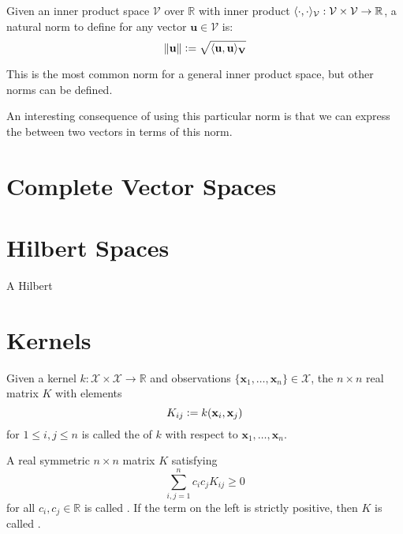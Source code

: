 
Given an inner product space $\mathcal{V}$ over $\mathbb{R}$ with inner product $\langle\cdot, \cdot\rangle_\mathcal{V} : \mathcal{V} \times \mathcal{V} \to \mathbb{R}$, a natural norm to define for any vector $\mathbf{u} \in \mathcal{V}$ is:
\begin{equation}
	\lVert\mathbf{u}\rVert \vcentcolon= \sqrt{\langle\mathbf{u}, \mathbf{u}\rangle_\mathbf{V}} 
\end{equation}

This is the most common norm for a general inner product space, but other norms can be defined. 

An interesting consequence of using this particular norm is that we can express the  between two vectors in terms of this norm.

\begin{definition}[Distance ]
\end{definition}

\section{Complete Vector Spaces}

\section{Hilbert Spaces}

\begin{definition}
A Hilbert
\end{definition}


\section{Kernels}

\begin{definition}
Given a kernel $k : \mathcal{X} \times \mathcal{X} \to \mathbb{R}$ and observations $\{ \mathbf{x}_1, \dotsc, \mathbf{x}_n \} \in \mathcal{X}$, the $n \times n$ real matrix $K$ with elements
\begin{equation}
	K_{ij} \vcentcolon= k(\mathbf{x}_i, \mathbf{x}_j)
\end{equation}
for $1 \leq i, j \leq n$ is called the  of $k$ with respect to $\mathbf{x}_1, \dotsc, \mathbf{x}_n$.
\end{definition}

\begin{definition}
A real symmetric $n \times n$ matrix $K$ satisfying
\begin{equation}
	\sum_{i, j=1}^n c_i c_j K_{ij} \geq 0
\end{equation}
for all $c_i, c_j \in \mathbb{R}$ is called . If the term on the left is strictly positive, then $K$ is called .
\end{definition}

